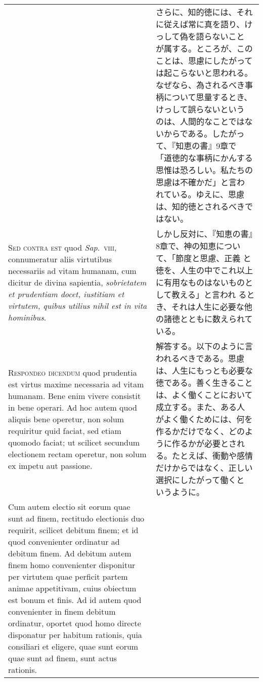 \documentclass[10pt]{jsarticle}
\begin{document}
\begin{longtable}{p{21em}p{21em}}
&

さらに、知的徳には、それに従えば常に真を語り、けっして偽を語らないこと
が属する。ところが、このことは、思慮にしたがっては起こらないと思われる。
なぜなら、為されるべき事柄について思量するとき、けっして誤らないという
のは、人間的なことではないからである。したがって、『知恵の書』9章で
「道徳的な事柄にかんする思惟は恐ろしい。私たちの思慮は不確かだ」と言わ
れている。ゆえに、思慮は、知的徳とされるべきではない。

\\

{\scshape Sed contra est} quod {\itshape Sap}.~{\scshape viii},
connumeratur aliis virtutibus necessariis ad vitam humanam, cum
dicitur de divina sapientia, {\itshape sobrietatem et prudentiam
docet, iustitiam et virtutem, quibus utilius nihil est in vita
hominibus}.

&

しかし反対に、『知恵の書』8章で、神の知恵について、「節度と思慮、正義
と徳を、人生の中でこれ以上に有用なものはないものとして教える」と言われ
るとき、それは人生に必要な他の諸徳とともに数えられている。

\\

{\scshape Respondeo dicendum} quod prudentia est virtus maxime
necessaria ad vitam humanam. Bene enim vivere consistit in bene
operari. Ad hoc autem quod aliquis bene operetur, non solum requiritur
quid faciat, sed etiam quomodo faciat; ut scilicet secundum electionem
rectam operetur, non solum ex impetu aut passione.

&

解答する。以下のように言われるべきである。思慮は、人生にもっとも必要な
徳である。善く生きることは、よく働くことにおいて成立する。また、ある人
がよく働くためには、何を作るかだけでなく、どのように作るかが必要とされ
る。たとえば、衝動や感情だけからではなく、正しい選択にしたがって働くと
いうように。

\\

Cum autem electio sit eorum quae sunt ad finem, rectitudo electionis
duo requirit, scilicet debitum finem; et id quod convenienter
ordinatur ad debitum finem. Ad debitum autem finem homo convenienter
disponitur per virtutem quae perficit partem animae appetitivam, cuius
obiectum est bonum et finis. Ad id autem quod convenienter in finem
debitum ordinatur, oportet quod homo directe disponatur per habitum
rationis, quia consiliari et eligere, quae sunt eorum quae sunt ad
finem, sunt actus rationis.


\end{longtable}
\end{document}
